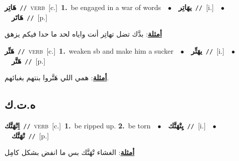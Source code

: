 \documentclass[10pt,a4paper,twoside]{article} %
\begin{document}
\begin{multicols}{2}
{{{{{{{{{{{{\setlength\topsep{0pt}\textbf{\foreignlanguage{arabic}{هَاتِر}}\ {\color{gray}\texttt{//}\color{black}}\ \textsc{verb}\ [c.]\ \textbf{1.}~be engaged in a war of words\ \ $\bullet$\ \ \setlength\topsep{0pt}\textbf{\foreignlanguage{arabic}{يهَاتِر}}\ {\color{gray}\texttt{//}\color{black}}\ [i.]\ \ $\bullet$\ \ \setlength\topsep{0pt}\textbf{\foreignlanguage{arabic}{هَاتَر}}\ {\color{gray}\texttt{//}\color{black}}\ [p.]\  \begin{flushright}\color{gray}\foreignlanguage{arabic}{\textbf{\underline{\foreignlanguage{arabic}{أمثلة}}}: بدَّك تضل تهاتِر أنت واياه لحد ما حدا فيكم يزهق}\end{flushright}\color{black}} \vspace{2mm}

{\setlength\topsep{0pt}\textbf{\foreignlanguage{arabic}{هَتِّر}}\ {\color{gray}\texttt{//}\color{black}}\ \textsc{verb}\ [c.]\ \textbf{1.}~weaken sb and make him a sucker\ \ $\bullet$\ \ \setlength\topsep{0pt}\textbf{\foreignlanguage{arabic}{يهَتِّر}}\ {\color{gray}\texttt{//}\color{black}}\ [i.]\ \ $\bullet$\ \ \setlength\topsep{0pt}\textbf{\foreignlanguage{arabic}{هَتَّر}}\ {\color{gray}\texttt{//}\color{black}}\ [p.]\  \begin{flushright}\color{gray}\foreignlanguage{arabic}{\textbf{\underline{\foreignlanguage{arabic}{أمثلة}}}: همي اللي هَتَّروا بنتهم بغبائهم.}\end{flushright}\color{black}} \vspace{2mm}

\vspace{-3mm}
\subsection*{\color{blue}\foreignlanguage{arabic}{ه.ت.ك}\color{blue}{}} 

{\setlength\topsep{0pt}\textbf{\foreignlanguage{arabic}{اِتْهَتَّك}}\ {\color{gray}\texttt{//}\color{black}}\ \textsc{verb}\ [c.]\ \textbf{1.}~be ripped up.  \textbf{2.}~be torn\ \ $\bullet$\ \ \setlength\topsep{0pt}\textbf{\foreignlanguage{arabic}{يِتْهَتَّك}}\ {\color{gray}\texttt{//}\color{black}}\ [i.]\ \ $\bullet$\ \ \setlength\topsep{0pt}\textbf{\foreignlanguage{arabic}{تْهَتَّك}}\ {\color{gray}\texttt{//}\color{black}}\ [p.]\  \begin{flushright}\color{gray}\foreignlanguage{arabic}{\textbf{\underline{\foreignlanguage{arabic}{أمثلة}}}: الغشاء تْهَتَّك بس ما انفض بشكل كامِل}\end{flushright}\color{black}} \vspace{2mm}

}}}}}}}}}}}
\end{multicols}
\end{document}
